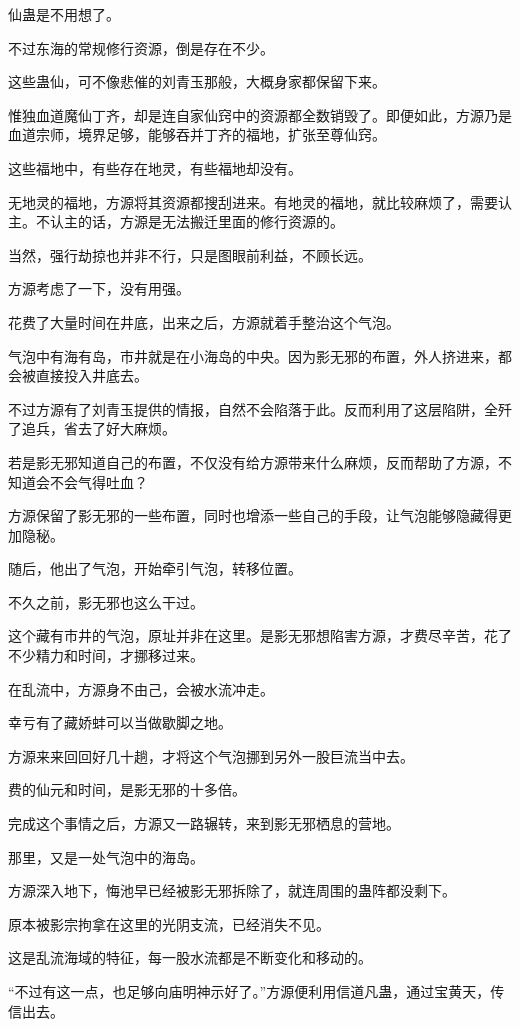 \begin{this_body}
仙蛊是不用想了。

不过东海的常规修行资源，倒是存在不少。

这些蛊仙，可不像悲催的刘青玉那般，大概身家都保留下来。

惟独血道魔仙丁齐，却是连自家仙窍中的资源都全数销毁了。即便如此，方源乃是血道宗师，境界足够，能够吞并丁齐的福地，扩张至尊仙窍。

这些福地中，有些存在地灵，有些福地却没有。

无地灵的福地，方源将其资源都搜刮进来。有地灵的福地，就比较麻烦了，需要认主。不认主的话，方源是无法搬迁里面的修行资源的。

当然，强行劫掠也并非不行，只是图眼前利益，不顾长远。

方源考虑了一下，没有用强。

花费了大量时间在井底，出来之后，方源就着手整治这个气泡。

气泡中有海有岛，市井就是在小海岛的中央。因为影无邪的布置，外人挤进来，都会被直接投入井底去。

不过方源有了刘青玉提供的情报，自然不会陷落于此。反而利用了这层陷阱，全歼了追兵，省去了好大麻烦。

若是影无邪知道自己的布置，不仅没有给方源带来什么麻烦，反而帮助了方源，不知道会不会气得吐血？

方源保留了影无邪的一些布置，同时也增添一些自己的手段，让气泡能够隐藏得更加隐秘。

随后，他出了气泡，开始牵引气泡，转移位置。

不久之前，影无邪也这么干过。

这个藏有市井的气泡，原址并非在这里。是影无邪想陷害方源，才费尽辛苦，花了不少精力和时间，才挪移过来。

在乱流中，方源身不由己，会被水流冲走。

幸亏有了藏娇蚌可以当做歇脚之地。

方源来来回回好几十趟，才将这个气泡挪到另外一股巨流当中去。

费的仙元和时间，是影无邪的十多倍。

完成这个事情之后，方源又一路辗转，来到影无邪栖息的营地。

那里，又是一处气泡中的海岛。

方源深入地下，悔池早已经被影无邪拆除了，就连周围的蛊阵都没剩下。

原本被影宗拘拿在这里的光阴支流，已经消失不见。

这是乱流海域的特征，每一股水流都是不断变化和移动的。

“不过有这一点，也足够向庙明神示好了。”方源便利用信道凡蛊，通过宝黄天，传信出去。

\end{this_body}

